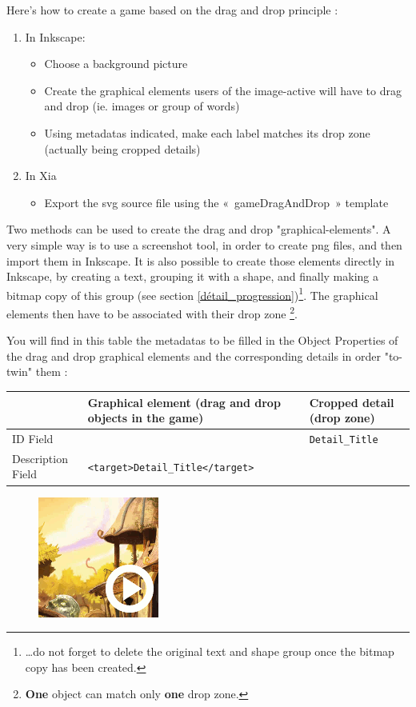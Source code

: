 Here's how to create a game based on the drag and drop principle :
\begin{enumerate}
 \item In Inkscape:
\begin{itemize}
 \item Choose a background picture
 \item Create the graphical elements users of the image-active will have to drag and drop (ie. images or group of words)
 \item Using metadatas indicated, make each label matches its drop zone (actually being cropped details)
\end{itemize}
 \item In Xia
 \begin{itemize}
  \item Export the svg source file using the «~gameDragAndDrop~» template
 \end{itemize}
\end{enumerate}

Two methods can be used to create the drag and drop "graphical-elements".
A very simple way is to use a screenshot tool, in order to create png files, and then import them in Inkscape.
It is also possible to create those elements directly in Inkscape, by creating a text, grouping it with a shape,
and finally making a bitmap copy of this group 
(see section \ref{détail_progression})\footnote{\ldots do not forget to delete
the original text and shape group once the bitmap copy has been created.}.
The graphical elements then have to be associated with their drop zone \footnote{\textbf{One} object can match only \textbf{one} drop zone.}.

You will find in this table the metadatas to be filled in the \chemin
{Object Properties} of the drag and drop graphical elements and the corresponding details in order "to-twin" them :

\begin{center}
\begin{tabular}{|p{}|p{2.5in}|p{1.5in}|}
\hline
 & Graphical element (drag and drop objects in the game) & Cropped detail (drop zone)\\
\hline
ID Field & & \verb|Detail_Title|\\
\hline
Description Field & \verb|<target>Detail_Title</target>| & \\
\hline
\end{tabular}
\end{center}

\begin{figure}
  \centering
  \includegraphics[scale=0.7]{./images/gameDragAndDrop} 
\end{figure}



